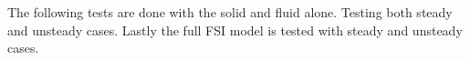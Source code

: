 The following tests are done with the solid and fluid alone. Testing both steady and unsteady cases. Lastly the full FSI model is tested with steady and unsteady cases.


%













